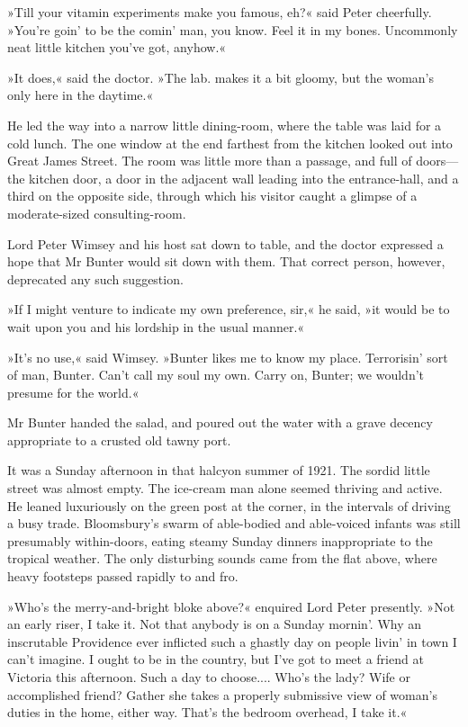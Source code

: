 »Till your vitamin experiments make you famous, eh?« said Peter cheerfully. »You're goin' to be the comin' man, you know. Feel it in my bones. Uncommonly neat little kitchen you've got, anyhow.«

»It does,« said the doctor. »The lab. makes it a bit gloomy, but the woman's only here in the daytime.«

He led the way into a narrow little dining-room, where the table was laid for a cold lunch. The one window at the end farthest from the kitchen looked out into Great James Street. The room was little more than a passage, and full of doors—the kitchen door, a door in the adjacent wall leading into the entrance-hall, and a third on the opposite side, through which his visitor caught a glimpse of a moderate-sized consulting-room.

Lord Peter Wimsey and his host sat down to table, and the doctor expressed a hope that Mr Bunter would sit down with them. That correct person, however, deprecated any such suggestion.

»If I might venture to indicate my own preference, sir,« he said, »it would be to wait upon you and his lordship in the usual manner.«

»It's no use,« said Wimsey. »Bunter likes me to know my place. Terrorisin' sort of man, Bunter. Can't call my soul my own. Carry on, Bunter; we wouldn't presume for the world.«

Mr Bunter handed the salad, and poured out the water with a grave decency appropriate to a crusted old tawny port.

It was a Sunday afternoon in that halcyon summer of 1921. The sordid little street was almost empty. The ice-cream man alone seemed thriving and active. He leaned luxuriously on the green post at the corner, in the intervals of driving a busy trade. Bloomsbury's swarm of able-bodied and able-voiced infants was still presumably within-doors, eating steamy Sunday dinners inappropriate to the tropical weather. The only disturbing sounds came from the flat above, where heavy footsteps passed rapidly to and fro.

»Who's the merry-and-bright bloke above?« enquired Lord Peter presently. »Not an early riser, I take it. Not that anybody is on a Sunday mornin'. Why an inscrutable Providence ever inflicted such a ghastly day on people livin' in town I can't imagine. I ought to be in the country, but I've got to meet a friend at Victoria this afternoon. Such a day to choose.... Who's the lady? Wife or accomplished friend? Gather she takes a properly submissive view of woman's duties in the home, either way. That's the bedroom overhead, I take it.«

